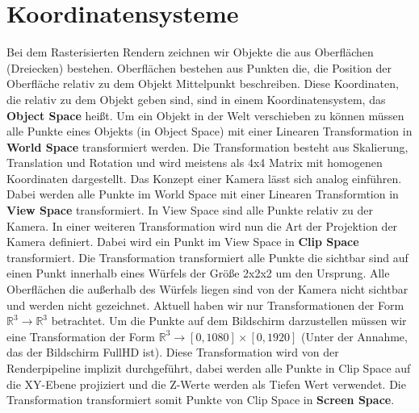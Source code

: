 \section{Koordinatensysteme}
\label{section:coords}
Bei dem Rasterisierten Rendern zeichnen wir Objekte die aus Oberflächen (Dreiecken) bestehen.
Oberflächen bestehen aus Punkten die, die Position der Oberfläche relativ zu dem Objekt Mittelpunkt beschreiben.
Diese Koordinaten, die relativ zu dem Objekt geben sind, sind in einem Koordinatensystem, das \textbf{Object Space} heißt.
Um ein Objekt in der Welt verschieben zu können müssen alle Punkte eines Objekts (in Object Space) mit einer Linearen Transformation
in \textbf{World Space} transformiert werden.
Die Transformation besteht aus Skalierung, Translation und Rotation und wird meistens als 4x4 Matrix mit homogenen Koordinaten dargestellt.
Das Konzept einer Kamera lässt sich analog einführen.
Dabei werden alle Punkte im World Space mit einer Linearen Transformtion in \textbf{View Space} transformiert.
In View Space sind alle Punkte relativ zu der Kamera.
In einer weiteren Transformation wird nun die Art der Projektion der Kamera definiert. 
Dabei wird ein Punkt im View Space in \textbf{Clip Space} transformiert.
Die Transformation transformiert alle Punkte die sichtbar sind auf einen Punkt innerhalb eines Würfels der Größe 2x2x2 um den Ursprung.
Alle Oberflächen die außerhalb des Würfels liegen sind von der Kamera nicht sichtbar und werden nicht gezeichnet.
Aktuell haben wir nur Transformationen der Form $\mathbb{R}^3 \rightarrow \mathbb{R}^3$ betrachtet.
Um die Punkte auf dem Bildschirm darzustellen müssen wir eine Transformation der Form 
$\mathbb{R}^3 \rightarrow [0,1080]\times[0,1920]$ (Unter der Annahme, das der Bildschirm FullHD ist).
Diese Transformation wird von der Renderpipeline implizit durchgeführt, dabei werden alle Punkte in Clip Space 
auf die XY-Ebene projiziert und die Z-Werte werden als Tiefen Wert verwendet. 
Die Transformation transformiert somit Punkte von Clip Space in \textbf{Screen Space}.

